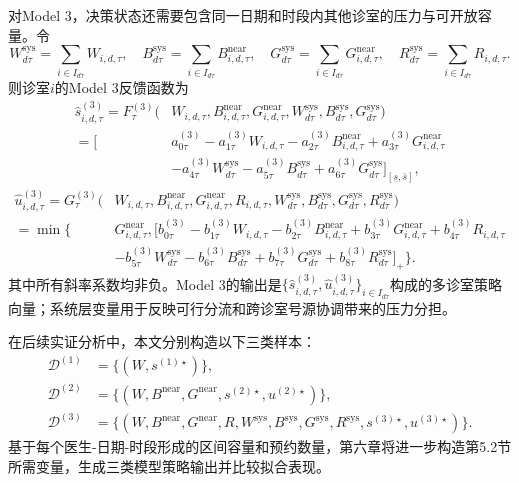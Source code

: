 \documentclass[a4paper,zihao=-4]{ctexart}
\numberwithin{figure}{section}
\numberwithin{table}{section}
\begin{document}
对Model 3，决策状态还需要包含同一日期和时段内其他诊室的压力与可开放容量。令
\[
W_{d\tau}^{\mathrm{sys}}=\sum_{i\in I_{d\tau}}W_{i,d,\tau},\quad
B_{d\tau}^{\mathrm{sys}}=\sum_{i\in I_{d\tau}}B_{i,d,\tau}^{\mathrm{near}},\quad
G_{d\tau}^{\mathrm{sys}}=\sum_{i\in I_{d\tau}}G_{i,d,\tau}^{\mathrm{near}},\quad
R_{d\tau}^{\mathrm{sys}}=\sum_{i\in I_{d\tau}}R_{i,d,\tau}.
\]
则诊室$i$的Model 3反馈函数为
\begin{equation}
\begin{aligned}
\hat s_{i,d,\tau}^{(3)}
=F_{\tau}^{(3)}(&W_{i,d,\tau},B_{i,d,\tau}^{\mathrm{near}},G_{i,d,\tau}^{\mathrm{near}},
W_{d\tau}^{\mathrm{sys}},B_{d\tau}^{\mathrm{sys}},G_{d\tau}^{\mathrm{sys}})\\
=\big[&
a_{0\tau}^{(3)}-a_{1\tau}^{(3)}W_{i,d,\tau}
-a_{2\tau}^{(3)}B_{i,d,\tau}^{\mathrm{near}}
+a_{3\tau}^{(3)}G_{i,d,\tau}^{\mathrm{near}}\\
&-a_{4\tau}^{(3)}W_{d\tau}^{\mathrm{sys}}
-a_{5\tau}^{(3)}B_{d\tau}^{\mathrm{sys}}
+a_{6\tau}^{(3)}G_{d\tau}^{\mathrm{sys}}
\big]_{[\underline s,\bar s]},
\end{aligned}
\label{eq:model3-service-feedback-function}
\end{equation}
\begin{equation}
\begin{aligned}
\hat u_{i,d,\tau}^{(3)}
=G_{\tau}^{(3)}(&W_{i,d,\tau},B_{i,d,\tau}^{\mathrm{near}},G_{i,d,\tau}^{\mathrm{near}},R_{i,d,\tau},
W_{d\tau}^{\mathrm{sys}},B_{d\tau}^{\mathrm{sys}},G_{d\tau}^{\mathrm{sys}},R_{d\tau}^{\mathrm{sys}})\\
=\min\{&
G_{i,d,\tau}^{\mathrm{near}},
\big[
b_{0\tau}^{(3)}-b_{1\tau}^{(3)}W_{i,d,\tau}
-b_{2\tau}^{(3)}B_{i,d,\tau}^{\mathrm{near}}
+b_{3\tau}^{(3)}G_{i,d,\tau}^{\mathrm{near}}
+b_{4\tau}^{(3)}R_{i,d,\tau}\\
&-b_{5\tau}^{(3)}W_{d\tau}^{\mathrm{sys}}
-b_{6\tau}^{(3)}B_{d\tau}^{\mathrm{sys}}
+b_{7\tau}^{(3)}G_{d\tau}^{\mathrm{sys}}
+b_{8\tau}^{(3)}R_{d\tau}^{\mathrm{sys}}
\big]_+
\}.
\end{aligned}
\label{eq:model3-booking-feedback-function}
\end{equation}
其中所有斜率系数均非负。Model 3的输出是$\{\hat s_{i,d,\tau}^{(3)},\hat u_{i,d,\tau}^{(3)}\}_{i\in I_{d\tau}}$构成的多诊室策略向量；系统层变量用于反映可行分流和跨诊室号源协调带来的压力分担。

在后续实证分析中，本文分别构造以下三类样本：
\begin{equation}
\begin{aligned}
\mathcal D^{(1)}&=\{(W,s^{(1)\star})\},\\
\mathcal D^{(2)}&=\{(W,B^{\mathrm{near}},G^{\mathrm{near}},s^{(2)\star},u^{(2)\star})\},\\
\mathcal D^{(3)}&=\{(W,B^{\mathrm{near}},G^{\mathrm{near}},R,
W^{\mathrm{sys}},B^{\mathrm{sys}},G^{\mathrm{sys}},R^{\mathrm{sys}},
s^{(3)\star},u^{(3)\star})\}.
\end{aligned}
\end{equation}
基于每个医生-日期-时段形成的区间容量和预约数量，第六章将进一步构造第5.2节所需变量，生成三类模型策略输出并比较拟合表现。
\end{document}
